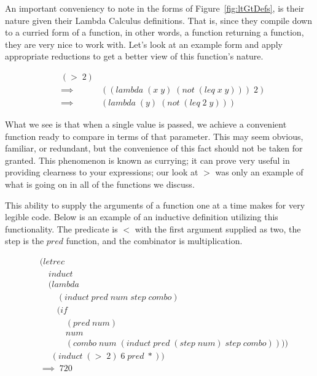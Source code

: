 An important conveniency to note in the forms of Figure~\ref{fig:ltGtDefs}, is
their nature given their Lambda Calculus definitions. That is, since they
compile down to a curried form of a function, in other words, a function
returning a function, they are very nice to work with. Let's look at an example
form and apply appropriate reductions to get a better view of this function's
nature.

\begin{figure}[htp]
\footnotesize
\caption{}\label{fig:gtNature}
\begin{align*}
& (> \; 2)
\\& \implies \; &((lambda \; (x \; y) \; (not \; (leq \; x \; y))) \; 2)
\\& \implies \; &(lambda \; (y) \; (not \; (leq \; 2 \; y))) \; 
\end{align*}
\end{figure}

What we see is that when a single value is passed, we achieve a convenient 
function ready to compare in terms of that parameter. This may seem obvious, 
familiar, or redundant, but the convenience of this fact should not be taken for 
granted. This phenomenon is known as currying; it can prove very useful in 
providing clearness to your expressions; our look at $>$ was only an example of 
what is going on in all of the functions we discuss.

This ability to supply the arguments of a function one at a time makes for very 
legible code. Below is an example of an inductive definition utilizing this 
functionality. The predicate is $<$ with the first argument supplied as two, the 
step is the $pred$ function, and the combinator is multiplication.

\begin{figure}[htp]
\footnotesize
\caption{}\label{fig:inductiveCalculator}
\begin{align*}
& (letrec \; 
\\& \quad induct \; 
\\& \quad (lambda \; 
\\& \qquad (induct \; pred \; num \; step \; combo) \; 
\\& \qquad (if \; 
\\& \qquad \quad (pred \; num) \; 
\\& \qquad \quad num \; 
\\& \qquad \quad (combo \; num \; (induct \; pred \; (step \; num) \; step \; combo)))) \; 
\\& \quad \; (induct \; (> \; 2) \; 6 \; pred \; *))
\\& \implies \; 720
\end{align*}
\end{figure}

